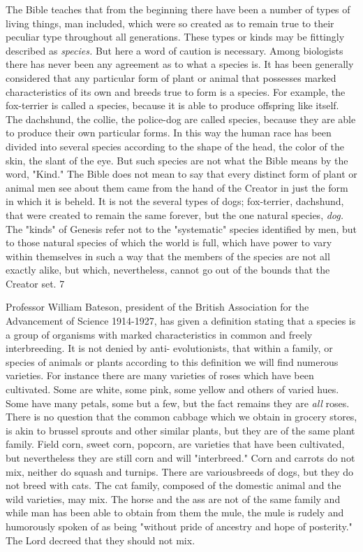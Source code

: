 The Bible teaches that from the beginning there have been a number of types of living things,
man included, which were so created as to remain true to their peculiar type throughout all
generations. These types or kinds may be fittingly described as \textit{species.} But here a word of
caution is necessary. Among biologists there has never been any agreement as to what a
species is. It has been generally considered that any particular form of plant or animal that
possesses marked characteristics of its own and breeds true to form is a species. For example,
the fox-terrier is called a species, because it is able to produce offspring like itself. The
dachshund, the collie, the police-dog are called species, because they are able to produce
their own particular forms. In this way the human race has been divided into several species
according to the shape of the head, the color of the skin, the slant of the eye. But such species
are not what the Bible means by the word, "Kind." The Bible does not mean to say that every
distinct form of plant or animal men see about them came from the hand of the Creator in just
the form in which it is beheld. It is not the several types of dogs; fox-terrier, dachshund, that
were created to remain the same forever, but the one natural species, \textit{dog.} The "kinds" of
Genesis refer not to the "systematic" species identified by men, but to those natural species of
which the world is full, which have power to vary within themselves in such a way that the
members of the species are not all exactly alike, but which, nevertheless, cannot go out of the
bounds that the Creator set. 7

Professor William Bateson, president of the British Association for the Advancement of
Science 1914-1927, has given a definition stating that a species is a group of organisms with
marked characteristics in common and freely interbreeding. It is not denied by anti-
evolutionists, that within a family, or species of animals or plants according to this definition
we will find numerous varieties. For instance there are many varieties of roses which have
been cultivated. Some are white, some pink, some yellow and others of varied hues. Some
have many petals, some but a few, but the fact remains they are \textit{all} roses. There is no
question that the common cabbage which we obtain in grocery stores, is akin to brussel
sprouts and other similar plants, but they are of the same plant family. Field corn, sweet corn,
popcorn, are varieties that have been cultivated, but nevertheless they are still corn and will
"interbreed." Corn and carrots do not mix, neither do squash and turnips. There are variousbreeds of dogs, but they do not breed with cats. The cat family, composed of the domestic
animal and the wild varieties, may mix. The horse and the ass are not of the same family and
while man has been able to obtain from them the mule, the mule is rudely and humorously
spoken of as being "without pride of ancestry and hope of posterity." The Lord decreed that
they should not mix.

